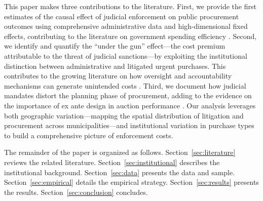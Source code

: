 This paper makes three contributions to the literature. First, we provide the first estimates of the causal effect of judicial enforcement on public procurement outcomes using comprehensive administrative data and high-dimensional fixed effects, contributing to the literature on government spending efficiency \citep{bandiera2009active, best2023procurement, decarolis2018buyer}. Second, we identify and quantify the ``under the gun'' effect---the cost premium attributable to the threat of judicial sanctions---by exploiting the institutional distinction between administrative and litigated urgent purchases. This contributes to the growing literature on how oversight and accountability mechanisms can generate unintended costs \citep{rasul2018management, williams2021bureaucratic, duflo2018obligations}. Third, we document how judicial mandates distort the planning phase of procurement, adding to the evidence on the importance of ex ante design in auction performance \citep{coviello2018bidding, szucs2023competition, baltrunaite2021discretion}. Our analysis leverages both geographic variation---mapping the spatial distribution of litigation and procurement across municipalities---and institutional variation in purchase types to build a comprehensive picture of enforcement costs.

The remainder of the paper is organized as follows. Section~\ref{sec:literature} reviews the related literature. Section~\ref{sec:institutional} describes the institutional background. Section~\ref{sec:data} presents the data and sample. Section~\ref{sec:empirical} details the empirical strategy. Section~\ref{sec:results} presents the results. Section~\ref{sec:conclusion} concludes.

